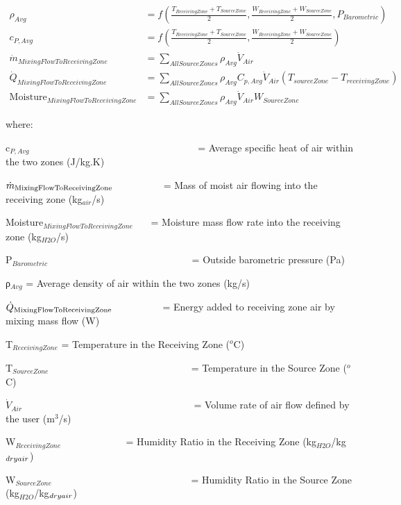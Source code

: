\begin{equation}
 \begin{array}{cl}
    \rho_{Avg} & = f \left( \frac{T_{ReceivingZone} + T_{SourceZone}}{2},\frac{W_{ReceivingZone} + W_{SourceZone}}{2},P_{Barometric} \right) \\
    c_{P,Avg} & = f \left( \frac{T_{ReceivingZone} + T_{SourceZone}}{2},\frac{W_{ReceivingZone} + W_{SourceZone}}{2}\right) \\
    \dot m_{MixingFlowToReceivingZone} & = \sum_{AllSourceZones} \rho_{Avg}\dot V_{Air} \\
    \dot Q_{MixingFlowToReceivingZone} & = \sum_{AllSourceZones} \rho_{Avg}C_{p,Avg}\dot V_{Air}\left(T_{sourceZone}-T_{receivingZone}\right) \\
    \text{Moisture}_{MixingFlowToReceivingZone} & = \sum_{AllSourceZones} \rho_{Avg} \dot V_{Air} W_{SourceZone}
  \end{array}
\end{equation}

where:

c\(_{P,Avg}\)~~~~~~~~~~~~~~~~~~~~~~~~~~~~~~~~~~ = Average specific heat of air within the two zones (J/kg.K)

\({\dot m_{{\rm{MixingFlowToReceivingZone}}}}\) ~~~~~~~~~ = Mass of moist air flowing into the receiving zone (kg\(_{air}\)/s)

Moisture\(_{MixingFlowToReceivingZone}\)~~~ = Moisture mass flow rate into the receiving zone (kg\(_{H2O}\)/s)

P\(_{Barometric}\)~~~~~~~~~~~~~~~~~~~~~~~~~~~~~ = Outside barometric pressure (Pa)

ρ\(_{Avg}\) = Average density of air within the two zones (kg/s)

\({\dot Q_{{\rm{MixingFlowToReceivingZone}}}}\) ~~~~~~~~~ = Energy added to receiving zone air by mixing mass flow (W)

T\(_{ReceivingZone}\) = Temperature in the Receiving Zone (\(^{o}\)C)

T\(_{SourceZone}\) ~~~~~~~~~~~~~~~~~~~~~~~~~~~~ = Temperature in the Source Zone (\(^{o}\)C)

\({\dot V_{Air}}\) ~~~~~~~~~~~~~~~~~~~~~~~~~~~~~~~~~~ = Volume rate of air flow defined by the user (m\(^{3}\)/s)

W\(_{ReceivingZone}\) ~~~~~~~~~~~~ = Humidity Ratio in the Receiving Zone (kg\(_{H2O}\)/kg\(_{dry\\ air}\))

W\(_{SourceZone}\)~~~~~~~~~~~~~~~~~~~~~~~~~~~~ = Humidity Ratio in the Source Zone (kg\(_{H2O}\)/kg\(_{dry\\ air}\))

